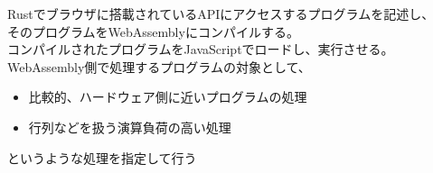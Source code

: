 
Rustでブラウザに搭載されているAPIにアクセスするプログラムを記述し、\\そのプログラムをWebAssemblyにコンパイルする。\\コンパイルされたプログラムをJavaScriptでロードし、実行させる。\\
WebAssembly側で処理するプログラムの対象として、
\begin{itemize}
	\item 比較的、ハードウェア側に近いプログラムの処理
	\item 行列などを扱う演算負荷の高い処理
\end{itemize}
というような処理を指定して行う

\newpage

